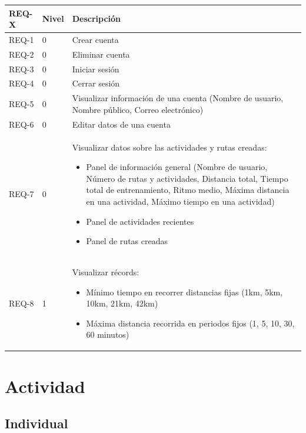 \begin{longtable}{p{2cm} p{1cm} p{11cm}}
\toprule
\textbf{REQ-X} & \textbf{Nivel} & \textbf{Descripción} \\
\midrule
\endhead

REQ-1 & 0 & Crear cuenta \\
REQ-2 & 0 & Eliminar cuenta \\
REQ-3 & 0 & Iniciar sesión \\
REQ-4 & 0 & Cerrar sesión \\
REQ-5 & 0 & Visualizar información de una cuenta (Nombre de usuario, Nombre público, Correo electrónico) \\
REQ-6 & 0 & Editar datos de una cuenta \\
REQ-7 & 0 & Visualizar datos sobre las actividades y rutas creadas:
\begin{itemize}
    \item Panel de información general (Nombre de usuario, Número de rutas y actividades, Distancia total, Tiempo total de entrenamiento, Ritmo medio,  Máxima distancia en una actividad, Máximo tiempo en una actividad)
    \item Panel de actividades recientes
    \item Panel de rutas creadas
\end{itemize} \\
REQ-8 & 1 & Visualizar récords:
\begin{itemize}
    \item Mínimo tiempo en recorrer distancias fijas (1km, 5km, 10km, 21km, 42km)
    \item Máxima distancia recorrida en periodos fijos (1, 5, 10, 30, 60 minutos)
\end{itemize} \\

\bottomrule
\end{longtable}

\section{Actividad}
\subsection{Individual}

